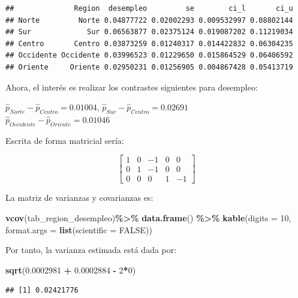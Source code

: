 \documentclass[
  spanish,
  12pt,
]{book}
\newenvironment{Shaded}{\begin{snugshade}}{\end{snugshade}}
\newcommand{\AttributeTok}[1]{\textcolor[rgb]{0.13,0.29,0.53}{#1}}
\newcommand{\ConstantTok}[1]{\textcolor[rgb]{0.56,0.35,0.01}{#1}}
\newcommand{\DecValTok}[1]{\textcolor[rgb]{0.00,0.00,0.81}{#1}}
\newcommand{\FloatTok}[1]{\textcolor[rgb]{0.00,0.00,0.81}{#1}}
\newcommand{\FunctionTok}[1]{\textcolor[rgb]{0.13,0.29,0.53}{\textbf{#1}}}
\newcommand{\NormalTok}[1]{#1}
\newcommand{\SpecialCharTok}[1]{\textcolor[rgb]{0.81,0.36,0.00}{\textbf{#1}}}
\begin{document}
\begin{verbatim}
##              Region  desempleo         se        ci_l       ci_u
## Norte         Norte 0.04877722 0.02002293 0.009532997 0.08802144
## Sur             Sur 0.06563877 0.02375124 0.019087202 0.11219034
## Centro       Centro 0.03873259 0.01240317 0.014422832 0.06304235
## Occidente Occidente 0.03996523 0.01229650 0.015864529 0.06406592
## Oriente     Oriente 0.02950231 0.01256905 0.004867428 0.05413719
\end{verbatim}

Ahora, el interés es realizar los contrastes siguientes para desempleo:

\(\hat{p}_{Norte} - \hat{p}_{Centro} = 0.01004\),
\(\hat{p}_{Sur} - \hat{p}_{Centro} = 0.02691\)\\
\(\hat{p}_{Occidente} - \hat{p}_{Oriente} = 0.01046\)

Escrita de forma matricial sería:

\[
\left[\begin{array}{ccccc}
1 & 0 & -1 & 0 & 0\\
0 & 1 & -1 & 0 & 0\\
0 & 0 & 0 & 1 & -1
\end{array}\right]
\]

La matriz de varianzas y covarianzas es:

\begin{Shaded}
\begin{Highlighting}[]
\FunctionTok{vcov}\NormalTok{(tab\_region\_desempleo)}\SpecialCharTok{\%\textgreater{}\%}
  \FunctionTok{data.frame}\NormalTok{() }\SpecialCharTok{\%\textgreater{}\%} 
  \FunctionTok{kable}\NormalTok{(}\AttributeTok{digits =} \DecValTok{10}\NormalTok{,}
        \AttributeTok{format.args =} \FunctionTok{list}\NormalTok{(}\AttributeTok{scientific =} \ConstantTok{FALSE}\NormalTok{))}
\end{Highlighting}
\end{Shaded}

Por tanto, la varianza estimada está dada por:

\begin{Shaded}
\begin{Highlighting}[]
\FunctionTok{sqrt}\NormalTok{(}\FloatTok{0.0002981} \SpecialCharTok{+} \FloatTok{0.0002884} \SpecialCharTok{{-}} \DecValTok{2}\SpecialCharTok{*}\DecValTok{0}\NormalTok{)}
\end{Highlighting}
\end{Shaded}

\begin{verbatim}
## [1] 0.02421776
\end{verbatim}
\end{document}
